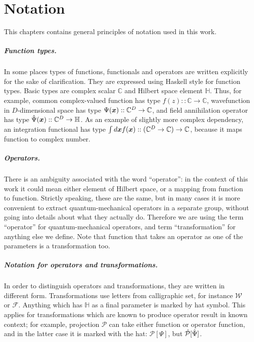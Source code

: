 \chapter{Notation}
\label{cha:appendix:notation}

This chapters contains general principles of notation used in this work.

\paragraph{Function types.}
In some places types of functions, functionals and operators are written explicitly for the sake of clarification.
They are expressed using Haskell style for function types.
Basic types are complex scalar $\mathbb{C}$ and Hilbert space element $\mathbb{H}$.
Thus, for example, common complex-valued function has type $f(z) :: \mathbb{C} \rightarrow \mathbb{C}$,
wavefunction in $D$-dimensional space has type $\Psi(\boldsymbol{x}) :: \mathbb{C}^D \rightarrow \mathbb{C}$,
and field annihilation operator has type $\hat{\Psi}(\boldsymbol{x}) :: \mathbb{C}^D \rightarrow \mathbb{H}$.
As an example of slightly more complex dependency,
an integration functional has type $\int d\boldsymbol{x} f(\boldsymbol{x}) :: (\mathbb{C}^D \rightarrow \mathbb{C}) \rightarrow \mathbb{C}$,
because it maps function to complex number.

\paragraph{Operators.}
There is an ambiguity associated with the word ``operator'':
in the context of this work it could mean either element of Hilbert space, or a mapping from function to function.
Strictly speaking, these are the same, but in many cases it is more convenient to extract quantum-mechanical operators in a separate group, without going into details about what they actually do.
Therefore we are using the term ``operator'' for quantum-mechanical operators,
and term ``transformation'' for anything else we define.
Note that function that takes an operator as one of the parameters is a transformation too.

\paragraph{Notation for operators and transformations.}
In order to distinguish operators and transformations, they are written in different form.
Transformations use letters from calligraphic set, for instance $\mathcal{W}$ or $\mathcal{F}$.
Anything which has $\mathbb{H}$ as a final parameter is marked by hat symbol.
This applies for transformations which are known to produce operator result in known context;
for example, projection $\mathcal{P}$ can take either function or operator function,
and in the latter case it is marked with the hat: $\mathcal{P}[\Psi]$, but $\hat{\mathcal{P}}[\hat{\Psi}]$.

